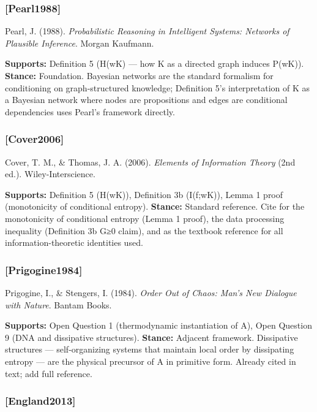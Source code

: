 \documentclass[
]{article}
\begin{document}
\subsubsection{{[}Pearl1988{]}}\label{pearl1988}

Pearl, J. (1988). \emph{Probabilistic Reasoning in Intelligent Systems:
Networks of Plausible Inference}. Morgan Kaufmann.

\textbf{Supports:} Definition 5 (H(w\textbar K) --- how K as a directed
graph induces P(w\textbar K)). \textbf{Stance:} Foundation. Bayesian
networks are the standard formalism for conditioning on graph-structured
knowledge; Definition 5's interpretation of K as a Bayesian network
where nodes are propositions and edges are conditional dependencies uses
Pearl's framework directly.

\subsubsection{{[}Cover2006{]}}\label{cover2006}

Cover, T. M., \& Thomas, J. A. (2006). \emph{Elements of Information
Theory} (2nd ed.). Wiley-Interscience.

\textbf{Supports:} Definition 5 (H(w\textbar K)), Definition 3b
(I(f;w\textbar K)), Lemma 1 proof (monotonicity of conditional entropy).
\textbf{Stance:} Standard reference. Cite for the monotonicity of
conditional entropy (Lemma 1 proof), the data processing inequality
(Definition 3b G≥0 claim), and as the textbook reference for all
information-theoretic identities used.

\subsubsection{{[}Prigogine1984{]}}\label{prigogine1984}

Prigogine, I., \& Stengers, I. (1984). \emph{Order Out of Chaos: Man's
New Dialogue with Nature}. Bantam Books.

\textbf{Supports:} Open Question 1 (thermodynamic instantiation of A),
Open Question 9 (DNA and dissipative structures). \textbf{Stance:}
Adjacent framework. Dissipative structures --- self-organizing systems
that maintain local order by dissipating entropy --- are the physical
precursor of A in primitive form. Already cited in text; add full
reference.

\subsubsection{{[}England2013{]}}\label{england2013}
\end{document}
